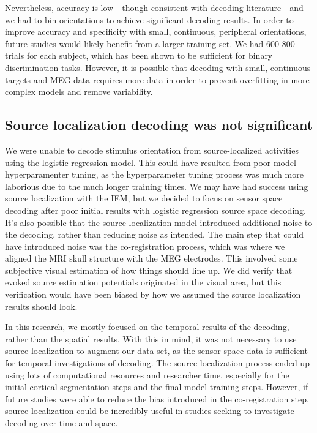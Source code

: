 \documentclass[../main.tex]{subfiles}
\begin{document}
Nevertheless, accuracy is low - though consistent with decoding literature - and we had to bin orientations to achieve significant decoding results. In order to improve accuracy and specificity with small, continuous, peripheral orientations, future studies would likely benefit from a larger training set. We had 600-800 trials for each subject, which has been shown to be sufficient for binary discrimination tasks. However, it is possible that decoding with small, continuous targets and MEG data requires more data in order to  prevent overfitting in more complex models and remove variability.

\subsection{Source localization decoding was not significant}
We were unable to decode stimulus orientation from source-localized activities using the logistic regression model. This could have resulted from poor model hyperparamenter tuning, as the hyperparameter tuning process was much more laborious due to the much longer training times. We may have had success using source localization with the IEM, but we decided to focus on sensor space decoding after poor initial results with logistic regression source space decoding. It's also possible that the source localization model introduced additional noise to the decoding, rather than reducing noise as intended. The main step that could have introduced noise was the co-registration process, which was where we aligned the MRI skull structure with the MEG electrodes. This involved some subjective visual estimation of how things should line up. We did verify that evoked source estimation potentials originated in the visual area, but this verification would have been biased by how we assumed the source localization results should look.

In this research, we mostly focused on the temporal results of the decoding, rather than the spatial results. With this in mind, it was not necessary to use source localization to augment our data set, as the sensor space data is sufficient for temporal investigations of decoding. The source localization process ended up using lots of computational resources and researcher time, especially for the initial cortical segmentation steps and the final model training steps. However, if future studies were able to reduce the bias introduced in the co-registration step, source localization could be incredibly useful in studies seeking to investigate decoding over time and space.
\end{document}
